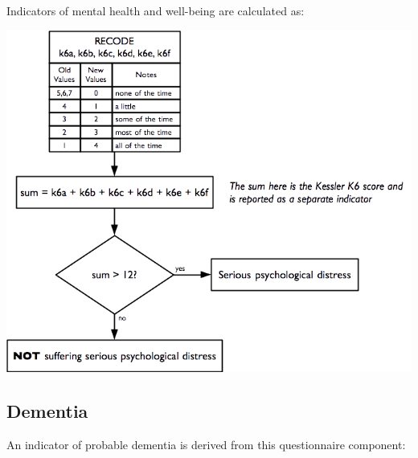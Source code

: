 \documentclass[12pt,a4paper]{book}
\theoremstyle{definition}
\theoremstyle{definition}
\theoremstyle{definition}
\theoremstyle{remark}
\begin{document}
Indicators of mental health and well-being are calculated as:

\begin{center}\includegraphics[width=9.76in]{figures/indicators19} \end{center}

\newpage

\hypertarget{dementia}{%
\subsection{Dementia}\label{dementia}}

An indicator of probable dementia is derived from this questionnaire
component:
\end{document}
